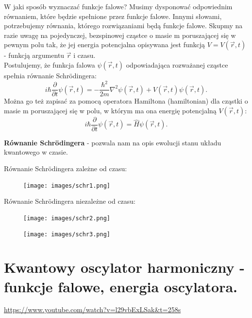 \documentclass{article}
\begin{document}
W jaki sposób wyznaczać funkcje falowe? Musimy dysponować odpowiednim równaniem, które będzie spełnione przez funkcje falowe. Innymi słowami, potrzebujemy równania, którego rozwiązaniami będą funkcje falowe. Skupmy na razie uwagę na pojedynczej, bezspinowej cząstce o masie m poruszającej się w pewnym polu tak, że jej energia potencjalna opisywana jest funkcją $V=V(\overrightarrow{r},t)$ - funkcją argumentu $\overrightarrow{r}$ i czasu. \\
Postulujemy, że funkcja falowa $\psi(\overrightarrow{r},t)$ odpowiadająca rozważanej cząstce spełnia równanie Schrödingera:
\begin{equation*}
    i\hbar \frac{\partial}{\partial t}\psi(\overrightarrow{r},t) = -\frac{\hbar^2}{2m}\nabla^2\psi(\overrightarrow{r},t)+V(\overrightarrow{r},t)\psi(\overrightarrow{r},t).
\end{equation*}
Można go też zapisać za pomocą operatora Hamiltona (hamiltonian) dla cząstki o masie m poruszającej się w polu, w którym ma ona energię potencjalną $V(\overrightarrow{r},t)$:
\begin{equation*}
    i\hbar \frac{\partial}{\partial t}\psi(\overrightarrow{r},t) = \hat{H}\psi(\overrightarrow{r},t).
\end{equation*}

\textbf{Równanie Schrödingera} - pozwala nam na opis ewolucji stanu układu kwantowego w czasie.

Równanie Schrödingera zależne od czasu:
\begin{figure}[H]
    \centering
    \texttt{[image: images/schr1.png]}
\end{figure}

Równanie Schrödingera niezależne od czasu:
\begin{figure}[H]
    \centering
    \texttt{[image: images/schr2.png]}
\end{figure}

\begin{figure}[H]
    \centering
    \texttt{[image: images/schr3.png]}
\end{figure}


\section{Kwantowy oscylator harmoniczny - funkcje falowe, energia oscylatora.}
\url{https://www.youtube.com/watch?v=l29vbExLSak&t=258s}
\end{document}
